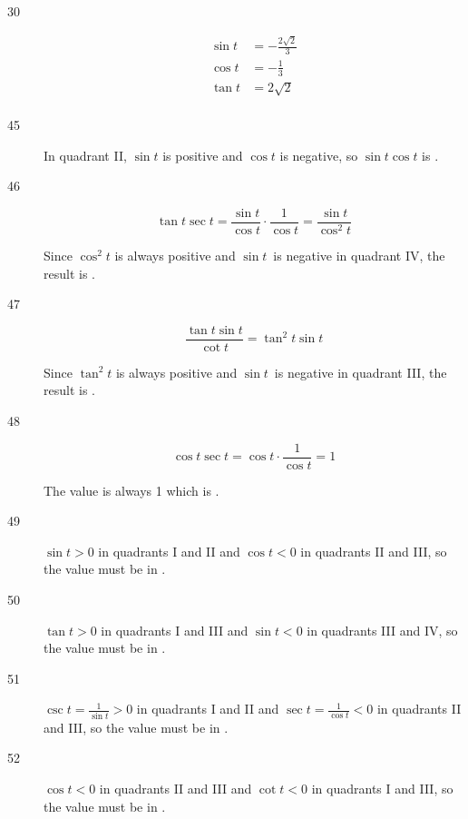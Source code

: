 \documentclass{exam}
\begin{document}
\begin{description}
      \item[30]
        \begin{align*}
          \sin t & = \boxed{ - \frac{2 \sqrt{2}}{3} } \\
          \cos t & = \boxed{ - \frac{1}{3} } \\
          \tan t & = \boxed{ 2 \sqrt{2} } \\
        \end{align*}

      \item[45]
        In quadrant II, $\sin t$ is positive and $\cos t$ is negative, so $\sin t \cos t$ is .

      \pagebreak

      \item[46]
        \[
          \tan t \sec t = \frac{\sin t}{\cos t} \cdot \frac{1}{\cos t} = \frac{\sin t}{\cos^2 t}
        \]

        Since $\cos^2 t$ is always positive and $\sin t$ is negative in quadrant IV, the result is .

      \item[47]
        \[
          \frac{\tan t \sin t}{\cot t} = \tan^2 t \sin t
        \]

        Since $\tan^2 t$ is always positive and $\sin t$ is negative in quadrant III, the result is .

      \item[48]
        \[
          \cos t \sec t = \cos t \cdot \frac{1}{\cos t} = 1
        \]

        The value is always 1 which is .

      \item[49] $\sin t > 0$ in quadrants I and II and $\cos t < 0$ in quadrants II and III, so the value must be in
        .

      \item[50] $\tan t > 0$ in quadrants I and III and $\sin t < 0$ in quadrants III and IV, so the value must be in
        .

      \item[51] $\csc t = \frac{1}{\sin t} > 0$ in quadrants I and II and $\sec t = \frac{1}{\cos t} < 0$ in quadrants
        II and III, so the value must be in .

      \item[52] $\cos t < 0$ in quadrants II and III and $\cot t < 0$ in quadrants I and III, so the value must be in
        .


\end{description}
\end{document}
